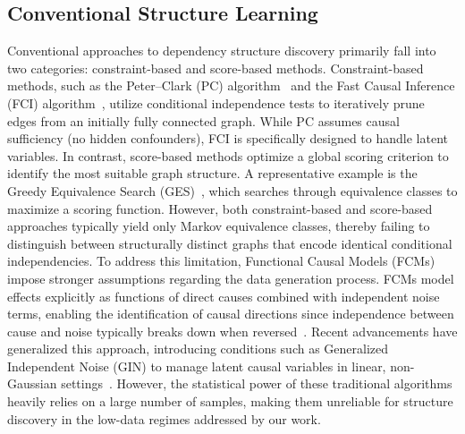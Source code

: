 \subsection{Conventional Structure Learning}
Conventional approaches to dependency structure discovery primarily fall into two categories: constraint-based and score-based methods. Constraint-based methods, such as the Peter--Clark (PC) algorithm~\cite{spirtes2000causation} and the Fast Causal Inference (FCI) algorithm~\cite{spirtes1995causal}, utilize conditional independence tests to iteratively prune edges from an initially fully connected graph. While PC assumes causal sufficiency (no hidden confounders), FCI is specifically designed to handle latent variables. In contrast, score-based methods optimize a global scoring criterion to identify the most suitable graph structure. A representative example is the Greedy Equivalence Search (GES)~\cite{chickering2002optimal}, which searches through equivalence classes to maximize a scoring function. However, both constraint-based and score-based approaches typically yield only Markov equivalence classes, thereby failing to distinguish between structurally distinct graphs that encode identical conditional independencies. To address this limitation, Functional Causal Models (FCMs) impose stronger assumptions regarding the data generation process. FCMs model effects explicitly as functions of direct causes combined with independent noise terms, enabling the identification of causal directions since independence between cause and noise typically breaks down when reversed~\cite{shimizu2006linear, hoyer2008nonlinear, zhang2009identifiability}. Recent advancements have generalized this approach, introducing conditions such as Generalized Independent Noise (GIN) to manage latent causal variables in linear, non-Gaussian settings~\cite{xie2020generalized}. However, the statistical power of these traditional algorithms heavily relies on a large number of samples, making them unreliable for structure discovery in the low-data regimes addressed by our work.

